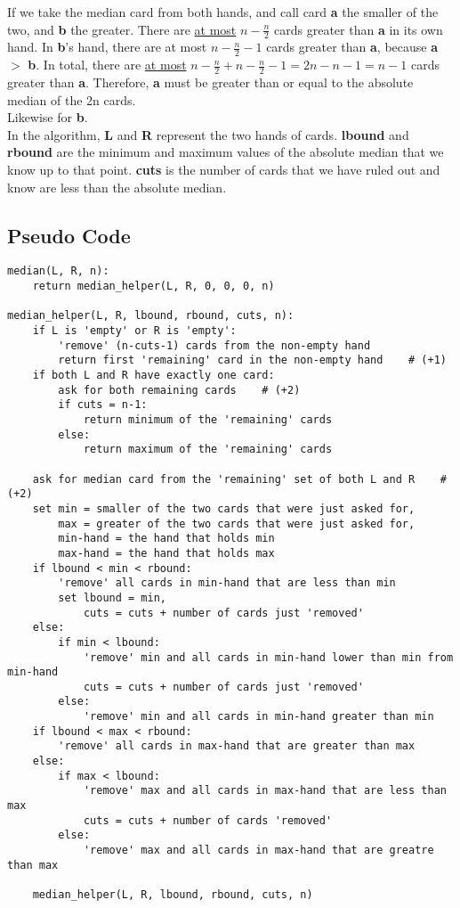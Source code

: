 \documentclass[a4paper,12pt]{article}
\begin{document}
\noindent If we take the median card from both hands, and call card
{\bf a} the smaller of the two, and {\bf b} the greater. There are
\underline{at most} \(n - \frac{n}{2}\) cards greater than {\bf a} in
its own hand. In {\bf b}'s hand, there are at most \(n - \frac{n}{2} -
1\) cards greater than {\bf a}, because {\bf a} \(>\) {\bf b}. In
total, there are \underline{at most} \( n - \frac{n}{2} + n -
\frac{n}{2} - 1 = 2n - n - 1 = n - 1\) cards greater
than {\bf a}. Therefore, {\bf a} must be greater than or equal to the absolute median of the 2n cards.\\

\noindent Likewise for {\bf b}.\\

\noindent In the algorithm, {\bf L} and {\bf R} represent the two
hands of cards. {\bf lbound} and {\bf rbound}
are the minimum and maximum values of the absolute median that we know up to that point. {\bf cuts} is the number of cards that we have ruled out and know are less than the absolute median.\\

\subsection*{Pseudo Code}
\begin{lstlisting}
median(L, R, n):
    return median_helper(L, R, 0, 0, 0, n)

median_helper(L, R, lbound, rbound, cuts, n):
    if L is 'empty' or R is 'empty':
        'remove' (n-cuts-1) cards from the non-empty hand
        return first 'remaining' card in the non-empty hand    # (+1)
    if both L and R have exactly one card:
        ask for both remaining cards    # (+2)
        if cuts = n-1:
            return minimum of the 'remaining' cards
        else:
            return maximum of the 'remaining' cards

    ask for median card from the 'remaining' set of both L and R    # (+2)
    set min = smaller of the two cards that were just asked for,
        max = greater of the two cards that were just asked for,
        min-hand = the hand that holds min
        max-hand = the hand that holds max
    if lbound < min < rbound:
        'remove' all cards in min-hand that are less than min
        set lbound = min,
            cuts = cuts + number of cards just 'removed'
    else:
        if min < lbound:
            'remove' min and all cards in min-hand lower than min from min-hand
            cuts = cuts + number of cards just 'removed'
        else:
            'remove' min and all cards in min-hand greater than min
    if lbound < max < rbound:
        'remove' all cards in max-hand that are greater than max
    else:
        if max < lbound:
            'remove' max and all cards in max-hand that are less than max
            cuts = cuts + number of cards 'removed'
        else:
            'remove' max and all cards in max-hand that are greatre than max

    median_helper(L, R, lbound, rbound, cuts, n)

\end{lstlisting}
\end{document}
